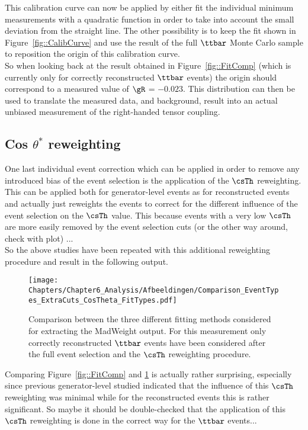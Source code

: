 This calibration curve can now be applied by either fit the individual minimum measurements with a quadratic function in order to take into account the small deviation from the straight line. The other possibility is to keep the fit shown in Figure~\ref{fig::CalibCurve} and use the result of the full $\ttbar$ Monte Carlo sample to reposition the origin of this calibration curve.
\\
So when looking back at the result obtained in Figure~\ref{fig::FitComp} (which is currently only for correctly reconstructed $\ttbar$ events) the origin should correspond to a measured value of $\gR$ = $-0.023$. This distribution can then be used to translate the measured data, and background, result into an actual unbiased measurement of the right-handed tensor coupling.

\subsection{Cos $\theta^{*}$ reweighting}
One last individual event correction which can be applied in order to remove any introduced bias of the event selection is the application of the $\csTh$ reweighting. This can be applied both for generator-level events as for reconstructed events and actually just reweights the events to correct for the different influence of the event selection on the $\csTh$ value. This because events with a very low $\csTh$ are more easily removed by the event selection cuts (or the other way around, check with plot) ...
\\

So the above studies have been repeated with this additional reweighting procedure and result in the following output.

\begin{figure}[h!t]
 \centering
 \texttt{[image: Chapters/Chapter6\_Analysis/Afbeeldingen/Comparison\_EventTypes\_ExtraCuts\_CosTheta\_FitTypes.pdf]}
 \caption{Comparison between the three different fitting methods considered for extracting the MadWeight output. For this measurement only correctly reconstructed $\ttbar$ events have been considered after the full event selection and the $\csTh$ reweighting procedure.} \label{fig::FitCompCos}
\end{figure}

Comparing Figure~\ref{fig::FitComp} and \ref{fig::FitCompCos} is actually rather surprising, especially since previous generator-level studied indicated that the influence of this $\csTh$ reweighting was minimal while for the reconstructed events this is rather significant. So maybe it should be double-checked that the application of this $\csTh$ reweighting is done in the correct way for the $\ttbar$ events...

